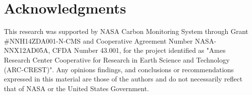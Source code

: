 \documentclass[11pt,a4paper]{article}
\begin{document}
\section{Acknowledgments}
This research was supported by NASA Carbon Monitoring System through Grant \#NNH14ZDA001-N-CMS and Cooperative Agreement Number NASA-NNX12AD05A, CFDA Number 43.001, for the project identified as "Ames Research Center Cooperative for Research in Earth Science and Technology (ARC-CREST)". Any opinions findings, and conclusions or recommendations expressed in this material are those of the authors and do not necessarily reflect that of NASA or the United States Government. 



\end{document}
